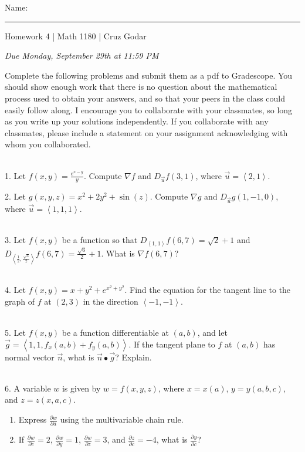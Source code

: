 \documentclass{article}
\begin{document}
\Large Name: \rule{2in}{0.15mm} \hfill Homework 4 | Math 1180 | Cruz Godar \vspace{4pt} \normalsize

\textit{Due Monday, September 29th at 11:59 PM}

Complete the following problems and submit them as a pdf to Gradescope. You should show enough work that there is no question about the mathematical process used to obtain your answers, and so that your peers in the class could easily follow along. I encourage you to collaborate with your classmates, so long as you write up your solutions independently. If you collaborate with any classmates, please include a statement on your assignment acknowledging with whom you collaborated.

~\\

1. Let $f(x, y) = \frac{e^{x - y}}{y}$. Compute $\nabla\! f$ and $D_{\vec{u}}f(3, 1)$, where $\vec{u} = \left< 2, 1 \right>$.

2. Let $g(x, y, z) = x^2 + 2y^2 + \sin(z)$. Compute $\nabla\! g$ and $D_{\vec{u}}g(1, -1, 0)$, where $\vec{u} = \left< 1, 1, 1 \right>$.

~\\

3. Let $f(x, y)$ be a function so that $D_{\left< 1, 1 \right>}f(6, 7) = \sqrt{2} + 1$ and $D_{\left< \frac{1}{2}, \frac{\sqrt{3}}{2} \right>}f(6, 7) = \frac{\sqrt{6}}{2} + 1$. What is $\nabla\! f (6, 7)$?

~\\

4. Let $f(x, y) = x + y^2 + e^{x^2 + y^2}$. Find the equation for the tangent line to the graph of $f$ at $(2, 3)$ in the direction $\left< -1, -1 \right>$.

~\\

5. Let $f(x, y)$ be a function differentiable at $(a, b)$, and let $\vec{g} = \left< 1, 1, f_x(a, b) + f_y(a, b) \right>$. If the tangent plane to $f$ at $(a, b)$ has normal vector $\vec{n}$, what is $\vec{n} \bullet \vec{g}$? Explain.

~\\

6. A variable $w$ is given by $w = f(x, y, z)$, where $x = x(a)$, $y = y(a, b, c)$, and $z = z(x, a, c)$.

\begin{enumerate}

	\item Express $\frac{\partial w}{\partial a}$ using the multivariable chain rule.

	\item If $\frac{\partial w}{\partial c} = 2$, $\frac{\partial w}{\partial y} = 1$, $\frac{\partial w}{\partial z} = 3$, and $\frac{\partial z}{\partial c} = -4$, what is $\frac{\partial y}{\partial c}$?

\end{enumerate}
\end{document}

